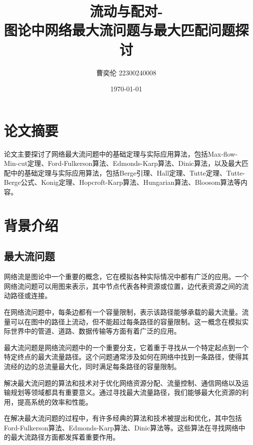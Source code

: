 \documentclass[UTF8]{ctexart}
\title{流动与配对-\\图论中网络最大流问题与最大匹配问题探讨}
\author{曹奕伦 22300240008}
\date{\today}
\begin{document}
\maketitle


\section{论文摘要}

论文主要探讨了网络最大流问题中的基础定理与实际应用算法，包括Max-flow-Min-cut定理\cite{enwiki:1192320700}、Ford-Fulkerson算法\cite{ford1956maximal}、Edmonds-Karp算法\cite{edmonds1972theoretical}、Dinic算法\cite{dinitz1970algorithm}，以及最大匹配中的基础定理与实际应用算法，包括Berge引理\cite{berge1957two}、Hall定理\cite{hall1987representatives}、Tutte定理\cite{tutte1950factorization}、Tutte-Berge公式\cite{berge1958couplage}、Konig定理\cite{kHonig1931grafok}、Hopcroft-Karp算法\cite{hopcroft1973n}、Hungarian算法\cite{munkres1957algorithms}、Bloosom算法\cite{edmonds1965paths}等内容。


\section{背景介绍}


\subsection{最大流问题}

网络流是图论中一个重要的概念，它在模拟各种实际情况中都有广泛的应用。一个网络流问题可以用图来表示，其中节点代表各种资源或位置，边代表资源之间的流动路径或连接。

在网络流问题中，每条边都有一个容量限制，表示该路径能够承载的最大流量。流量可以在图中的路径上流动，但不能超过每条路径的容量限制。这一概念在模拟实际世界中的管道、道路、数据传输等方面有着广泛的应用。

最大流问题是网络流问题中的一个重要分支，它着重于寻找从一个特定起点到一个特定终点的最大流量路径。这个问题通常涉及如何在网络中找到一条路径，使得其流经的边的总流量最大化，同时满足每条路径的容量限制。

解决最大流问题的算法和技术对于优化网络资源分配、流量控制、通信网络以及运输规划等领域都具有重要意义。通过寻找最大流量路径，我们能够最大化资源的利用，提高系统的效率和性能。

在解决最大流问题的过程中，有许多经典的算法和技术被提出和优化，其中包括Ford-Fulkerson算法\cite{ford1956maximal}、Edmonds-Karp算法\cite{edmonds1972theoretical}、Dinic算法\cite{dinitz1970algorithm}等。这些算法在寻找网络中的最大流路径方面都发挥着重要作用。
\end{document}
